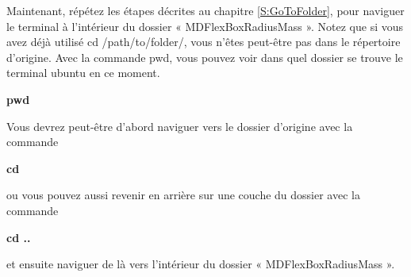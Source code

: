 \documentclass{article}
\begin{document}
Maintenant, répétez les étapes décrites au chapitre \ref{S:GoToFolder}, pour naviguer le terminal à l'intérieur du dossier « MDFlexBoxRadiusMass ». Notez que si vous avez déjà utilisé cd /path/to/folder/, vous n'êtes peut-être pas dans le répertoire d'origine. Avec la commande pwd, vous pouvez voir dans quel dossier se trouve le terminal ubuntu en ce moment.
\begin{tcolorbox}[width=\textwidth,colframe=BurntOrange,colback={black},title={ubuntu terminal},outer arc=0mm,colupper=white]  
    \large\textbf{  pwd }
\end{tcolorbox}
Vous devrez peut-être d'abord naviguer vers le dossier d'origine avec la commande
\begin{tcolorbox}[width=\textwidth,colframe=BurntOrange,colback={black},title={ubuntu terminal},outer arc=0mm,colupper=white]  
    \large\textbf{  cd }
\end{tcolorbox}
ou vous pouvez aussi revenir en arrière sur une couche du dossier avec la commande
\begin{tcolorbox}[width=\textwidth,colframe=BurntOrange,colback={black},title={ubuntu terminal},outer arc=0mm,colupper=white]  
    \large\textbf{  cd ..}
\end{tcolorbox}
et ensuite naviguer de là vers l'intérieur du dossier « MDFlexBoxRadiusMass ».
\end{document}
